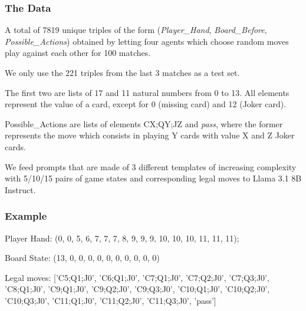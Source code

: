 \documentclass{beamer}
\theoremstyle{definition}
\theoremstyle{plain}
\theoremstyle{Remark}
\begin{document}
			
	
	
	\begin{frame}
		\frametitle{The Data}
		A total of 7819 unique triples of the form (\emph{Player\_Hand}, \emph{Board\_Before}, \emph{Possible\_Actions}) obtained by letting four agents which choose random moves play against each other for 100 matches.\pause \bigskip
		
		We only use the 221 triples from the last 3 matches as a test set.\pause \bigskip
		
		The first two are lists of 17 and 11 natural numbers from 0 to 13. All elements represent the value of a card, except for 0 (missing card) and 12 (Joker card).\pause \bigskip
		
		Possible\_Actions are lists of elements CX;QY;JZ and \emph{pass}, where the former represents the move
		which consists in playing Y cards with value X and
		Z Joker cards. \pause\bigskip
		
		We feed prompts that are made of 3 different templates of increasing complexity with 5/10/15 pairs of game states and corresponding legal moves to Llama 3.1 8B Instruct.
		
	\end{frame}
	
	\begin{frame}
		\frametitle{Example}
		
		Player Hand: (0, 0, 5, 6, 7, 7, 7, 8, 9, 9, 9, 10, 10, 10,
		11, 11, 11);\bigskip
		
		
		Board State: (13, 0, 0, 0, 0, 0, 0, 0, 0, 0, 0)\bigskip
		
		
		Legal moves:  [’C5;Q1;J0’, ’C6;Q1;J0’, ’C7;Q1;J0’,
		’C7;Q2;J0’, ’C7;Q3;J0’, ’C8;Q1;J0’,
		’C9;Q1;J0’, ’C9;Q2;J0’, ’C9;Q3;J0’,
		’C10;Q1;J0’, ’C10;Q2;J0’, ’C10;Q3;J0’,
		’C11;Q1;J0’, ’C11;Q2;J0’, ’C11;Q3;J0’,
		’pass’]
		
		
	\end{frame}
	
\end{document}
